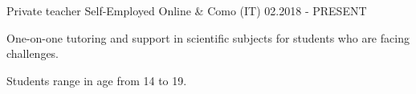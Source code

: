 
\cventry
{Private teacher}
{Self-Employed}
{Online \& Como (IT)}
{02.2018 - PRESENT}
{
    \begin{cvitems}
        \item {One-on-one tutoring and support in scientific subjects for students who are facing challenges.}
        \item {Students range in age from 14 to 19.}
    \end{cvitems}
}